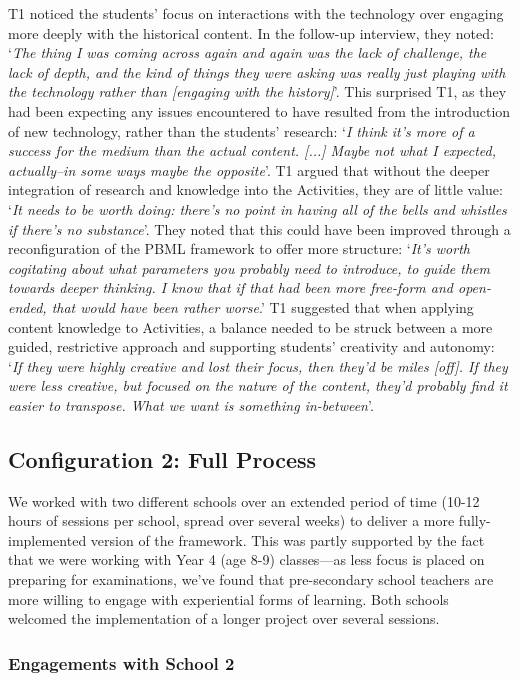 T1 noticed the students' focus on interactions with the technology over engaging more deeply with the historical content. In the follow-up interview, they noted: `\textit{The thing I was coming across again and again was the lack of challenge, the lack of depth, and the kind of things they were asking was really just playing with the technology rather than [engaging with the history]}'. This surprised T1, as they had been expecting any issues encountered to have resulted from the introduction of new technology, rather than the students' research: `\textit{I think it's more of a success for the medium than the actual content. [...] Maybe not what I expected, actually--in some ways maybe the opposite}'. T1 argued that without the deeper integration of research and knowledge into the Activities, they are of little value: `\textit{It needs to be worth doing: there's no point in having all of the bells and whistles if there's no substance}'. They noted that this could have been improved through a reconfiguration of the PBML framework to offer more structure: `\textit{It's worth cogitating about what parameters you probably need to introduce, to guide them towards deeper thinking. I know that if that had been more free-form and open-ended, that would have been rather worse}.' T1 suggested that when applying content knowledge to Activities, a balance needed to be struck between a more guided, restrictive approach and supporting students' creativity and autonomy: `\textit{If they were highly creative and lost their focus, then they'd be miles [off]. If they were less creative, but focused on the nature of the content, they'd probably find it easier to transpose. What we want is something in-between}'.

\subsection{Configuration 2: Full Process}
We worked with two different schools over an extended period of time (10-12 hours of sessions per school, spread over several weeks) to deliver a more fully-implemented version of the framework. This was partly supported by the fact that we were working with Year 4 (age 8-9) classes---as less focus is placed on preparing for examinations, we've found that pre-secondary school teachers are more willing to engage with experiential forms of learning. Both schools welcomed the implementation of a longer project over several sessions.

\subsubsection{Engagements with School 2}


